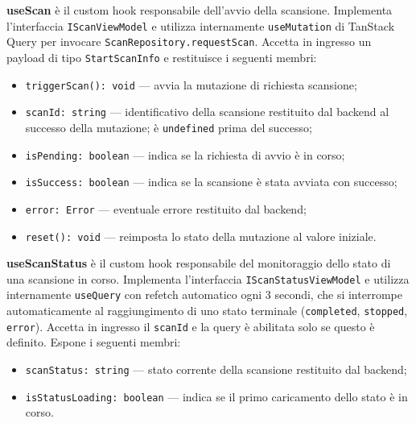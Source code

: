 \documentclass[a4paper, 11pt]{article}
\begin{document}
\textbf{useScan} è il custom hook responsabile dell'avvio della scansione. Implementa
l'interfaccia \texttt{IScanViewModel} e utilizza internamente \texttt{useMutation} di TanStack
Query per invocare \texttt{ScanRepository.requestScan}. Accetta in ingresso un payload di tipo
\texttt{StartScanInfo} e restituisce i seguenti membri:
\begin{itemize}
  \item \texttt{triggerScan(): void} — avvia la mutazione di richiesta scansione;
  \item \texttt{scanId: string} — identificativo della scansione restituito dal backend al
        successo della mutazione; è \texttt{undefined} prima del successo;
  \item \texttt{isPending: boolean} — indica se la richiesta di avvio è in corso;
  \item \texttt{isSuccess: boolean} — indica se la scansione è stata avviata con successo;
  \item \texttt{error: Error} — eventuale errore restituito dal backend;
  \item \texttt{reset(): void} — reimposta lo stato della mutazione al valore iniziale.
\end{itemize}

\textbf{useScanStatus} è il custom hook responsabile del monitoraggio dello stato di una
scansione in corso. Implementa l'interfaccia \texttt{IScanStatusViewModel} e utilizza
internamente \texttt{useQuery} con refetch automatico ogni 3 secondi, che si interrompe
automaticamente al raggiungimento di uno stato terminale (\texttt{completed}, \texttt{stopped},
\texttt{error}). Accetta in ingresso il \texttt{scanId} e la query è abilitata solo se questo
è definito. Espone i seguenti membri:
\begin{itemize}
  \item \texttt{scanStatus: string} — stato corrente della scansione restituito dal backend;
  \item \texttt{isStatusLoading: boolean} — indica se il primo caricamento dello stato è in corso.
\end{itemize}
\end{document}
